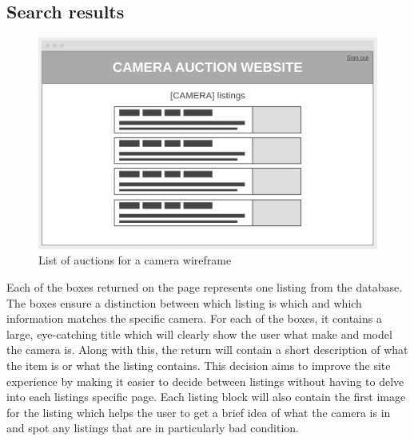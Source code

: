 \subsection{Search results}
\begin{figure}[H]
    \centering
    \includegraphics[scale=0.4]{ch2_design/wire_listings.png}
    \caption{List of auctions for a camera wireframe}
    \label{fig:wire_results}
\end{figure}
Each of the boxes returned on the page represents one listing from the database. The boxes ensure a distinction between which listing is which and which information matches the specific camera. For each of the boxes, it contains a large, eye-catching title which will clearly show the user what make and model the camera is. Along with this, the return will contain a short description of what the item is or what the listing contains. This decision aims to improve the site experience by making it easier to decide between listings without having to delve into each listings specific page. Each listing block will also contain the first image for the listing which helps the user to get a brief idea of what the camera is in and spot any listings that are in particularly bad condition.

